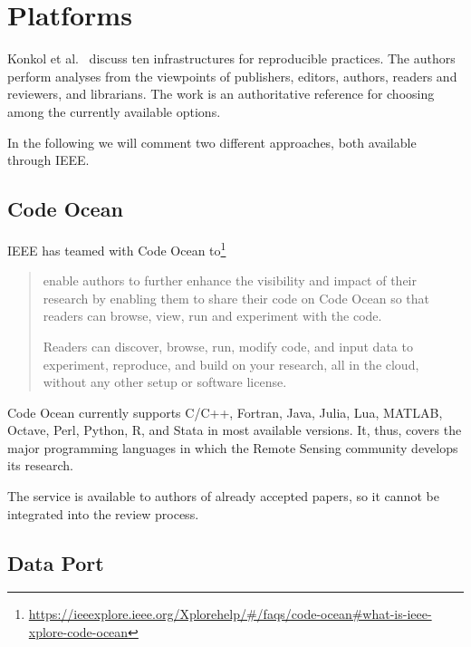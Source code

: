 \documentclass[journal,twoside]{IEEEtran}
\begin{document}
\section{Platforms}

Konkol et al.~\cite{PublishingComputationalResearchaReviewofInfrastructuresforReproducibleandTransparentScholarlyCommunication} discuss ten infrastructures for reproducible practices.
The authors perform analyses from the viewpoints of publishers, editors, authors, readers and reviewers, and librarians.
The work is an authoritative reference for choosing among the currently available options.

In the following we will comment two different approaches, both available through IEEE.

\subsection{Code Ocean}

IEEE has teamed with Code Ocean to\footnote{\url{https://ieeexplore.ieee.org/Xplorehelp/#/faqs/code-ocean#what-is-ieee-xplore-code-ocean}}
\begin{quote}
enable authors to further enhance the visibility and impact of their research by enabling them to share their code on Code Ocean so that readers can browse, view, run and experiment with the code.

Readers can discover, browse, run, modify code, and input data to experiment, reproduce, and build on your research, all in the cloud, without any other setup or software license.
\end{quote}

Code Ocean currently supports 
C/C++, 
Fortran,
Java,
Julia,
Lua,
MATLAB,
Octave,
Perl,
Python,
R, and
Stata in most available versions.
It, thus, covers the major programming languages in which the Remote Sensing community develops its research.

The service is available to authors of already accepted papers, so it cannot be integrated into the review process.

\subsection{Data Port}
\end{document}
